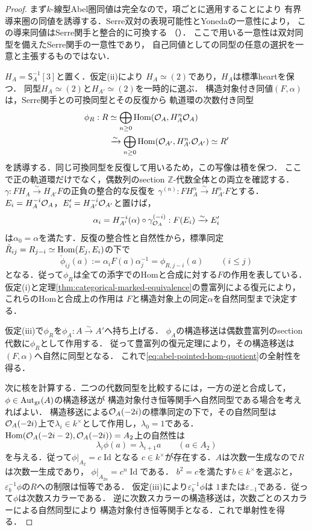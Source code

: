 \begin{proof}
まず$k$-線型Abel圏同値は完全なので，項ごとに適用することにより
有界導来圏の同値を誘導する．Serre双対の表現可能性とYonedaの一意性により，
この導来同値はSerre関手と整合的に可換する
（\cite[Lemma~57.3.5, Tag~0FY3]{StacksAbel}）．
ここで用いる一意性は双対同型を備えたSerre関手の一意性であり，
自己同値としての同型の任意の選択を一意と主張するものではない．

$H_A=\mathsf S_A^{-1}[3]$と置く．仮定\textup{(ii)}により
$H_A\simeq(2)$であり，$H_A$は標準heartを保つ．
同型$H_A\simeq(2)$と$H_{A'}\simeq(2)$を一時的に選ぶ．
構造対象付き同値$(F,\alpha)$は，Serre関手との可換同型とその反復から
軌道環の次数付き同型
\begin{align*}
 \phi_R:R
 &\simeq\bigoplus_{n\ge0}
       \operatorname{Hom}(\mathcal O_A,H_A^n\mathcal O_A)\\
 &\xrightarrow{\sim}\bigoplus_{n\ge0}
       \operatorname{Hom}(\mathcal O_{A'},H_{A'}^n\mathcal O_{A'})
 \simeq R'
\end{align*}
を誘導する．同じ可換同型を反復して用いるため，この写像は積を保つ．
ここで正の軌道環だけでなく，偶数列のsection $\mathbb Z$-代数全体との両立を確認する．
$\gamma:FH_A\xrightarrow{\sim}H_{A'}F$の正負の整合的な反復を
$\gamma^{(n)}:FH_A^n\xrightarrow{\sim}H_{A'}^nF$とする．
$E_i=H_A^{-i}\mathcal O_A$，$E'_i=H_{A'}^{-i}\mathcal O_{A'}$と置けば，
\[
 \alpha_i=H_{A'}^{-i}(\alpha)\circ\gamma^{(-i)}_{\mathcal O_A}
      :F(E_i)\xrightarrow{\sim}E'_i
\]
は$\alpha_0=\alpha$を満たす．反復の整合性と自然性から，標準同定
$\check R_{ij}=R_{j-i}\simeq\operatorname{Hom}(E_j,E_i)$の下で
\begin{equation}\label{eq:abel-even-section-coherence}
 \check\phi_{ij}(a)
   :=\alpha_iF(a)\alpha_j^{-1}
   =\phi_{R,j-i}(a)
       \qquad(i\leq j)
\end{equation}
となる．従って$\phi_R$は全ての添字でのHomと合成に対する$F$の作用を表している．
仮定\textup{(i)}と定理\ref{thm:categorical-marked-equivalence}の豊富列による復元により，
これらのHomと合成上の作用は
$F$と構造対象上の同定$\alpha$を自然同型まで決定する．

仮定\textup{(iii)}で$\phi_R$を$\phi_A:A\xrightarrow{\sim}A'$へ持ち上げる．
$\phi_A$の構造移送は偶数豊富列のsection代数に$\phi_R$として作用する．
従って豊富列の復元定理により，その構造移送は$(F,\alpha)$へ自然に同型となる．
これで\eqref{eq:abel-pointed-hom-quotient}の全射性を得る．

次に核を計算する．二つの代数同型を比較するには，一方の逆と合成して，
$\phi\in\operatorname{Aut}_{\rm gr}(A)$の構造移送が
構造対象付き恒等関手へ自然同型である場合を考えればよい．
構造移送による$\mathcal O_A(-2i)$の標準同定の下で，その自然同型は
$\mathcal O_A(-2i)$上で$\lambda_i\in k^\times$として作用し，$\lambda_0=1$である．
$\operatorname{Hom}(\mathcal O_A(-2i-2),\mathcal O_A(-2i))=A_2$上の自然性は
\[
 \lambda_i\phi(a)=\lambda_{i+1}a\qquad(a\in A_2)
\]
を与える．従って$\phi|_{A_2}=c\operatorname{Id}$となる
$c\in k^\times$が存在する．$A$は次数一生成なので$R$は次数一生成であり，
$\phi|_{A_{2n}}=c^n\operatorname{Id}$である．
$b^2=c$を満たす$b\in k^\times$を選ぶと，
$\varepsilon_b^{-1}\phi$の$R$への制限は恒等である．
仮定\textup{(iii)}により$\varepsilon_b^{-1}\phi$は
$1$または$\varepsilon_{-1}$である．従って$\phi$は次数スカラーである．
逆に次数スカラーの構造移送は，次数ごとのスカラーによる自然同型により
構造対象付き恒等関手となる．これで単射性を得る．


\end{proof}
